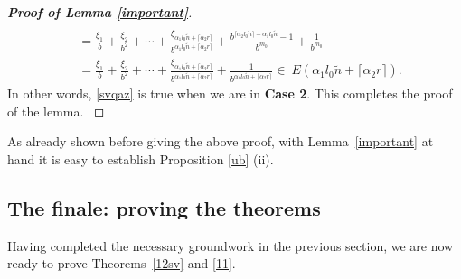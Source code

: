 \documentclass[12pt]{article}
\theoremstyle{definition}
\theoremstyle{remark}
\begin{document}
\begin{proof}[\rm \textbf{Proof of Lemma \ref{important}}]
\begin{equation*}
\begin{aligned}
\\[2ex]
&=\frac{\xi_{1}}{b}+\frac{\xi_{2}}{b^{2}}+\cdots+\frac{\xi_{\alpha_{1}l_{0}\tilde{n}+\lceil\alpha_{2} r\rceil}}{b^{\alpha_{1}l_{0}\tilde{n}+\lceil\alpha_{2} r\rceil}}+\frac{b^{\lceil\alpha_{2}l_{0}\tilde{n}\rceil-\alpha_{1}l_{0}\tilde{n}}-1}{b^{m_{0}}}+\frac{1}{b^{m_{0}}}
\\[2ex]
&=\frac{\xi_{1}}{b}+\frac{\xi_{2}}{b^{2}}+\cdots+\frac{\xi_{\alpha_{1}l_{0}\tilde{n}+\lceil\alpha_{2} r\rceil}}{b^{\alpha_{1}l_{0}\tilde{n}+\lceil\alpha_{2} r\rceil}}+\frac{1}{b^{\alpha_{1}l_{0}\tilde{n}+\lceil\alpha_{2} r\rceil}}\in \  E(\alpha_{1}l_{0}\tilde{n} +\lceil\alpha_{2}r\rceil).
\end{aligned}
\end{equation*}
In other words,  \eqref{svqaz} is true when we are in \textbf{Case 2}. This completes the proof of the lemma. 
\textrm{}
\end{proof}

As already shown before giving the above proof,  with Lemma~\ref{important} at hand it  is easy to establish  Proposition \ref{ub} (ii). 


\subsection{The finale: proving the theorems}  \label{pot}

Having completed the necessary groundwork in the previous section, we are now ready to prove Theorems~\ref{12sv} and \ref{11}.
\end{document}
